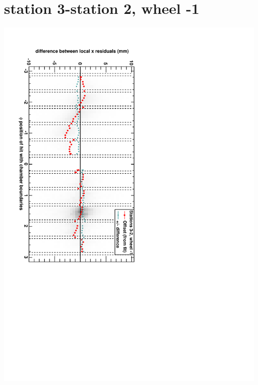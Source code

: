 \documentclass[compress]{beamer}
\begin{document}
\section*{station 3-station 2, wheel -1}
\begin{frame} \vfill \mbox{\hspace{-1 cm}\includegraphics[height=1.2\linewidth, angle=90]{DTrphidiff23VsPhi_whB_slope.pdf}} \end{frame}
\end{document}
